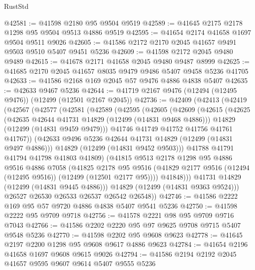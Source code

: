 \begin{lexlean}{RustStd}
\begin{coremodule}
@42581 := @41598 @2180 @95 @9504 @9519
@42589 := @41645 @2175 @2178 @1298 @95 @9504 @9513 @4886 @9519
@42595 := @41654 @2174 @41658 @1697 @9504 @9511 @9026
@42605 := @41586 @2172 @2170 @2045 @41657 @9491 @9503 @9510 @5407 @9451 @5236
@42609 := @41598 @2172 @2045 @9480 @9489
@42615 := @41678 @2171 @41658 @2045 @9480 @9487 @8999
@42625 := @41685 @2170 @2045 @41657 @8035 @9479 @9486 @5407 @9458 @5236 @41705
@42633 := @41586 @2168 @169 @2045 @57 @9476 @4886 @4838 @5407
@42635 := @42633 @9467 @5236
@42644 := @41719 @2167 @9476 (@12494 (@12495 @9476)) (@12499 (@12501 @2167 @2045))
@42736 := @42409
    (@42413
      (@42419
        (@42567
          (@42577
            (@42581
              (@42589
                (@42595
                  (@42605
                    (@42609
                      (@42615
                        (@42625
                          (@42635 @42644 @41731 @14829 (@12499 (@14831 @9468 @4886)))
                          @14829
                          (@12499 (@14831 @9459 @9479)))
                        @41746
                        @41749
                        @41752
                        @41756
                        @41761
                        @41767))
                    (@42633 @9496 @5236 @42644 @41731 @14829 (@12499 (@14831 @9497 @4886)))
                    @14829
                    (@12499 (@14831 @9452 @9503)))
                  @41788
                  @41791
                  @41794
                  @41798
                  @41803
                  @41809)
                (@41815
                  @9513
                  @2178
                  @1298
                  @95
                  @4886
                  @9516
                  @4886
                  @7058
                  (@41825
                    @2178
                    @95
                    @9516
                    (@41829 @2177 @9516 (@12494 (@12495 @9516)) (@12499 (@12501 @2177 @95))))
                  @41848)))
            @41731
            @14829
            (@12499 (@14831 @9445 @4886)))
          @14829
          (@12499 (@14831 @9363 @9524)))
        @26527
        @26530
        @26533
        @26537
        @26542
        @26548))
@42746 := @41586 @2222 @169 @95 @57 @9720 @4886 @4838 @5407 @9541 @5236
@42750 := @41598 @2222 @95 @9709 @9718
@42756 := @41578 @2221 @98 @95 @9709 @9716 @7043
@42766 := @41586 @2202 @2220 @95 @97 @9625 @9708 @9715 @5407 @9548 @5236
@42770 := @41598 @2202 @95 @9608 @9623
@42778 := @41645 @2197 @2200 @1298 @95 @9608 @9617 @4886 @9623
@42784 := @41654 @2196 @41658 @1697 @9608 @9615 @9026
@42794 := @41586 @2194 @2192 @2045 @41657 @9595 @9607 @9614 @5407 @9555 @5236

\end{coremodule}
\end{lexlean}
